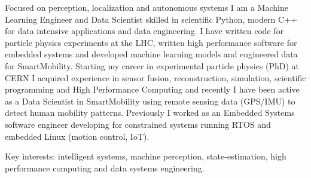 

\begin{cvparagraph}

Focused on perception, localization and autonomous systems I am a Machine Learning 
Engineer and Data Scientist skilled in scientific Python, modern C++ for data 
intensive applications and data engineering. I have written code for particle physics 
experiments at the LHC, written high performance software for embedded systems and 
developed machine learning models and engineered data for SmartMobility. Starting my 
career in experimental particle physics (PhD) at CERN I acquired experience 
in sensor fusion, reconstruction, simulation, scientific programming and High 
Performance Computing and recently I have been active as a Data Scientist in 
SmartMobility using remote sensing data (GPS/IMU) to detect human mobility
patterns. Previously I worked as an Embedded Systems software engineer developing
for constrained systems running RTOS and embedded Linux (motion control, IoT).

Key interests: intelligent systems, machine perception, state-estimation, 
high performance computing and data systems engineering.
\end{cvparagraph}